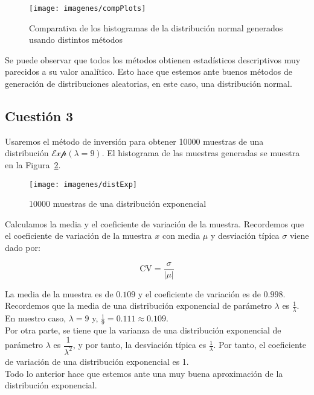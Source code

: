 \documentclass[12pt,a4paper,twoside,openright,titlepage,final]{article}
\begin{document}
\begin{figure}[htbp!]
\centering
\texttt{[image: imagenes/compPlots]}
\caption{Comparativa de los histogramas de la distribución normal generados usando distintos métodos}
\label{fig:compPlots}
\end{figure}

Se puede observar que todos los métodos obtienen estadísticos descriptivos muy parecidos a su valor analítico. Esto hace que estemos ante buenos métodos de generación de distribuciones aleatorias, en este caso, una distribución normal.  

\subsection{Cuestión 3}

Usaremos el método de inversión para obtener 10000 muestras de una distribución $\mathcal{Exp}(\lambda = 9)$. El histograma de las muestras generadas se muestra en la Figura~\ref{fig:distExp}.\\

\begin{figure}[htbp!]
\centering
\texttt{[image: imagenes/distExp]}
\caption{10000 muestras de una distribución exponencial}
\label{fig:distExp}
\end{figure}

Calculamos la media y el coeficiente de variación de la muestra. Recordemos que el coeficiente de variación de la muestra $x$ con media $\mu$ y desviación típica $\sigma$ viene dado por:

\[ \text{CV} = \dfrac{\sigma}{|\mu|} \]


La media de la muestra es de $0.109$ y el coeficiente de variación es de $0.998$.\\

Recordemos que la media de una distribución exponencial de parámetro $\lambda$ es $\frac{1}{\lambda}$. En nuestro caso, $\lambda = 9$ y, $\frac{1}{9} = 0.111 \approx 0.109$.\\

Por otra parte, se tiene que la varianza de una distribución exponencial de parámetro $\lambda$ es $\dfrac{1}{\lambda^2}$, y por tanto, la desviación típica es $\frac{1}{\lambda}$. Por tanto, el coeficiente de variación de una distribución exponencial es 1.\\

Todo lo anterior hace que estemos ante una muy buena aproximación de la distribución exponencial. 
\end{document}
